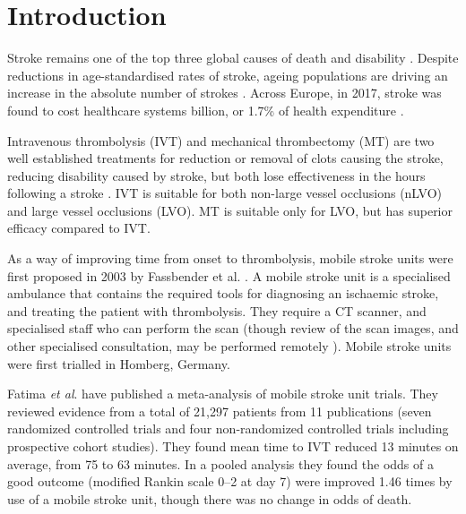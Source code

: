 \section{Introduction}


Stroke remains one of the top three global causes of death and disability \cite{feigin_global_2021}. Despite reductions in age-standardised rates of stroke, ageing populations are driving an increase in the absolute number of strokes \cite{feigin_global_2021}. Across Europe, in 2017, stroke was found to cost healthcare systems  billion, or 1.7\% of health expenditure \cite{luengo-fernandez_economic_2020}.

Intravenous thrombolysis (IVT) and mechanical thrombectomy (MT) are two well established treatments for reduction or removal of clots causing the stroke, reducing disability caused by stroke, but both lose effectiveness in the hours following a stroke \cite{emberson_effect_2014, fransen_time_2016}. IVT is suitable for both non-large vessel occlusions (nLVO) and large vessel occlusions (LVO). MT is suitable only for LVO, but has superior efficacy compared to IVT.


As a way of improving time from onset to thrombolysis, mobile stroke units were first proposed in 2003 by Fassbender et al. \cite{fassbender_mobile_2003}. A mobile stroke unit is a specialised ambulance that contains the required tools for diagnosing an ischaemic stroke, and treating the patient with thrombolysis. They require a CT scanner, and specialised staff who can perform the scan (though review of the scan images, and other specialised consultation, may be performed remotely \cite{taqui_reduction_2017}). Mobile stroke units were first trialled in Homberg, Germany\cite{walter_diagnosis_2012}.

Fatima \textit{et al}. \cite{fatima_mobile_2020} have published a meta-analysis of mobile stroke unit trials. They reviewed evidence from a total of 21,297 patients from 11 publications (seven randomized controlled trials and four non-randomized controlled trials including prospective cohort studies). They found mean time to IVT reduced 13 minutes on average, from 75 to 63 minutes. In a pooled analysis they found the odds of a good outcome (modified Rankin scale 0–2 at day 7) were improved 1.46 times by use of a mobile stroke unit, though there was no change in odds of death.

